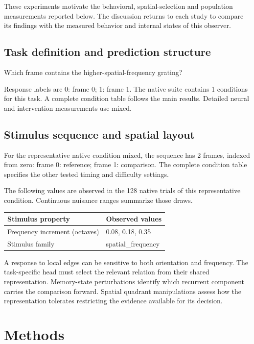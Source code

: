 \documentclass[11pt]{article}
\begin{document}
These experiments motivate the behavioral, spatial-selection and population measurements reported below. The discussion returns to each study to compare its findings with the measured behavior and internal states of this observer.
\subsection{Task definition and prediction structure}
Which frame contains the higher-spatial-frequency grating?

Response labels are 0: frame 0; 1: frame 1. The native suite contains 1 conditions for this task. A complete condition table follows the main results. Detailed neural and intervention measurements use mixed.

\subsection{Stimulus sequence and spatial layout}
For the representative native condition mixed, the sequence has 2 frames, indexed from zero: frame 0: reference; frame 1: comparison. The complete condition table specifies the other tested timing and difficulty settings.

The following values are observed in the 128 native trials of this representative condition. Continuous nuisance ranges summarize those draws.
\begin{center}\small\begin{tabular}{p{}p{}}\toprule Stimulus property & Observed values\\\midrule
Frequency increment (octaves) & 0.08, 0.18, 0.35\\
Stimulus family & spatial\_\allowbreak{}frequency\\
\bottomrule\end{tabular}\normalsize\end{center}
A response to local edges can be sensitive to both orientation and frequency. The task-specific head must select the relevant relation from their shared representation. Memory-state perturbations identify which recurrent component carries the comparison forward. Spatial quadrant manipulations assess how the representation tolerates restricting the evidence available for its decision.


\section{Methods}
\end{document}
